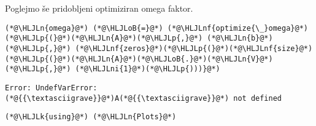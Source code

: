 \documentclass[12pt,a4paper]{article}
\newcommand{\HLJLk}[1]{\textcolor[RGB]{148,91,176}{\textbf{#1}}}
\newcommand{\HLJLn}[1]{#1}
\newcommand{\HLJLnf}[1]{\textcolor[RGB]{66,102,213}{#1}}
\newcommand{\HLJLni}[1]{\textcolor[RGB]{59,151,46}{#1}}
\newcommand{\HLJLoB}[1]{\textcolor[RGB]{102,102,102}{\textbf{#1}}}
\newcommand{\HLJLp}[1]{#1}
\begin{document}
Poglejmo še pridobljeni optimiziran omega faktor.


\begin{lstlisting}
(*@\HLJLn{omega}@*) (*@\HLJLoB{=}@*) (*@\HLJLnf{optimize{\_}omega}@*)(*@\HLJLp{(}@*)(*@\HLJLn{A}@*)(*@\HLJLp{,}@*) (*@\HLJLn{b}@*)(*@\HLJLp{,}@*) (*@\HLJLnf{zeros}@*)(*@\HLJLp{(}@*)(*@\HLJLnf{size}@*)(*@\HLJLp{(}@*)(*@\HLJLn{A}@*)(*@\HLJLoB{.}@*)(*@\HLJLn{V}@*)(*@\HLJLp{,}@*) (*@\HLJLni{1}@*)(*@\HLJLp{)))}@*)
\end{lstlisting}

\begin{lstlisting}
Error: UndefVarError: (*@{{\textasciigrave}}@*)A(*@{{\textasciigrave}}@*) not defined
\end{lstlisting}



\begin{lstlisting}
(*@\HLJLk{using}@*) (*@\HLJLn{Plots}@*)
\end{lstlisting}
\end{document}
